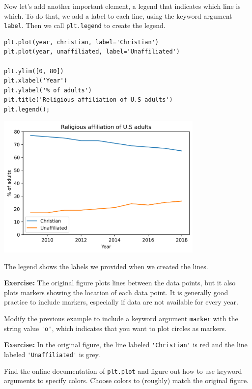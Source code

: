 Now let's add another important element, a legend that indicates which
line is which. To do that, we add a label to each line, using the
keyword argument \passthrough{\lstinline!label!}. Then we call
\passthrough{\lstinline!plt.legend!} to create the legend.

\begin{lstlisting}[]
plt.plot(year, christian, label='Christian')
plt.plot(year, unaffiliated, label='Unaffiliated')

plt.ylim([0, 80])
plt.xlabel('Year')
plt.ylabel('% of adults')
plt.title('Religious affiliation of U.S adults')
plt.legend();
\end{lstlisting}

\begin{center}
\includegraphics[width=4in]{chapters/06_plotting_files/06_plotting_31_0.png}
\end{center}

The legend shows the labels we provided when we created the lines.

\textbf{Exercise:} The original figure plots lines between the data
points, but it also plots markers showing the location of each data
point. It is generally good practice to include markers, especially if
data are not available for every year.

Modify the previous example to include a keyword argument
\passthrough{\lstinline!marker!} with the string value
\passthrough{\lstinline!'o'!}, which indicates that you want to plot
circles as markers.

\textbf{Exercise:} In the original figure, the line labeled
\passthrough{\lstinline!'Christian'!} is red and the line labeled
\passthrough{\lstinline!'Unaffiliated'!} is grey.

Find the online documentation of \passthrough{\lstinline!plt.plot!} and
figure out how to use keyword arguments to specify colors. Choose colors
to (roughly) match the original figure.

